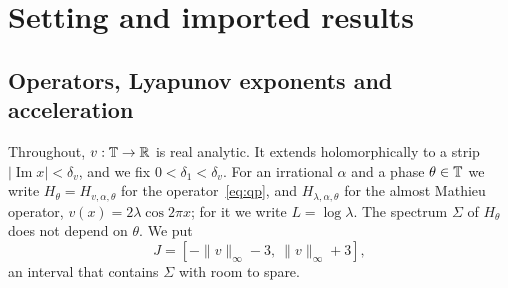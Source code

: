 \section{Setting and imported results}\label{sec:prelim}

\subsection{Operators, Lyapunov exponents and acceleration}

Throughout, $v:\mathbb T\to\mathbb R$ is real analytic. It extends holomorphically to a strip $|\operatorname{Im}x|<\delta_v$, and we fix $0<\delta_1<\delta_v$. For an irrational $\alpha$ and a phase $\theta\in\mathbb T$ we write $H_\theta=H_{v,\alpha,\theta}$ for the operator~\eqref{eq:qp}, and $H_{\lambda,\alpha,\theta}$ for the almost Mathieu operator, $v(x)=2\lambda\cos2\pi x$; for it we write $L=\log\lambda$. The spectrum $\Sigma$ of $H_\theta$ does not depend on $\theta$. We put
\[
J=[-\|v\|_\infty-3,\ \|v\|_\infty+3],
\]
an interval that contains $\Sigma$ with room to spare.

